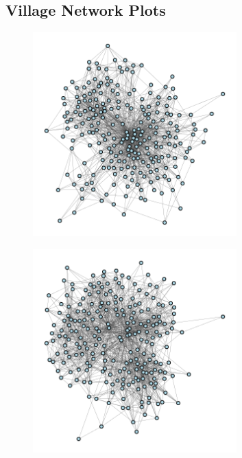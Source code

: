 \documentclass[12pt]{article}
\begin{document}
\begin{appendix}
\section{Village Network Plots}
\begin{figure}[bh!]
  \centering
  \caption{\protect}
  \includegraphics[width=0.7\textwidth]{../3_results/town_0.png} \\
\end{figure}
\begin{figure}
  \centering
  \caption{\protect}
  \includegraphics[width=0.7\textwidth]{../3_results/town_1.png} \\
\end{figure}
\begin{figure}
  \centering
  \caption{\protect}

\end{figure}
\end{appendix}
\end{document}
